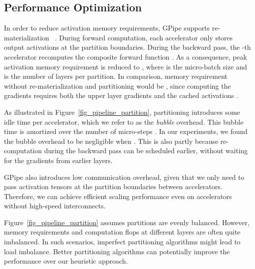 \documentclass{article}
\def\codename{GPipe}
\begin{document}
\subsection{Performance Optimization}

In order to reduce activation memory requirements, \codename{} supports re-materialization ~\cite{chen2016training}. During forward computation, each accelerator only stores output activations at the partition boundaries. During the backward pass, the -th accelerator recomputes the composite forward function . As a consequence, peak activation memory requirement is reduced to , where  is the micro-batch size and  is the number of layers per partition. In comparison, memory requirement without re-materialization and partitioning would be , since computing the gradients  requires both the upper layer gradients  and the cached activations .

As illustrated in Figure~\ref{fig_pipeline_partition}, partitioning introduces some idle time per accelerator, which we refer to as the {\it bubble} overhead. This bubble time is  amortized over the number of micro-steps . In our experiments, we found the bubble overhead to be negligible when . This is also partly because re-computation during the backward pass can be scheduled earlier, without waiting for the gradients from earlier layers.

\codename{} also introduces low communication overhead, given that we only need to pass activation tensors at the partition boundaries between accelerators. Therefore, we can achieve efficient scaling performance even on accelerators without high-speed interconnects. 

Figure~\ref{fig_pipeline_partition} assumes partitions are evenly balanced. However, memory requirements and computation flops at different layers are often quite imbalanced. In such scenarios, imperfect partitioning algorithms might lead to load imbalance. Better partitioning algorithms can potentially improve the performance over our heuristic approach.
\end{document}
